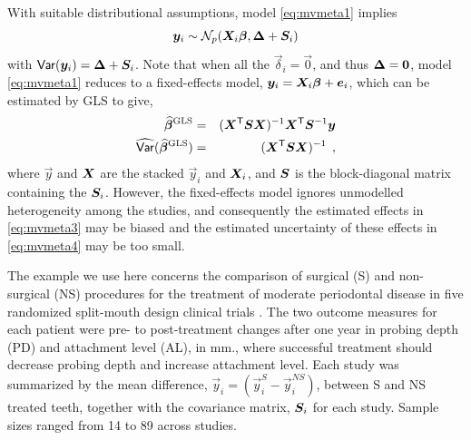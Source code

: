 With suitable distributional assumptions, model \eqref{eq:mvmeta1} implies
\begin{equation}\label{eq:mvmeta2}
	\bm{y}_i \sim \mathcal{N}_p ( \bm{X}_i \bm{\beta}, \bm{\Delta} + \bm{S}_i)
\end{equation}
with $\mathsf{Var}(\bm{y}_i) = \bm{\Delta} + \bm{S}_i$. Note that when all the
$\vec{\delta}_i = \vec{0}$, and thus $\bm{\Delta}=\bm{0}$,
model \eqref{eq:mvmeta1} reduces to a fixed-effects model, $\bm{y}_i = \bm{X}_i \bm{\beta} + \bm{e}_i$,
which can be estimated by GLS to give,
\begin{eqnarray}
\widehat{\bm{\beta}}^{\textrm{GLS}} & = & (\bm{X}^\mathsf{T} \bm{S} \bm{X})^{-1} \bm{X}^\mathsf{T} \bm{S}^{-1} \bm{y} \label{eq:mvmeta3} \\
\widehat{\mathsf{Var}}(\widehat{\bm{\beta}}^{\textrm{GLS}}) & = & (\bm{X}^\mathsf{T} \bm{S} \bm{X})^{-1}  \label{eq:mvmeta4} \:\: ,
\end{eqnarray}
where $\vec{y}$ and $\bm{X}$ are the stacked $\vec{y}_i$ and $\bm{X}_i$, and
$\bm{S}$ is the block-diagonal matrix containing the $\bm{S}_i$.
However, the fixed-effects model ignores unmodelled heterogeneity among the studies,
and consequently the estimated effects in \eqref{eq:mvmeta3} may be biased and 
the estimated uncertainty of these effects in \eqref{eq:mvmeta4} may be too small.

The example we use here concerns the comparison of surgical (S) and
non-surgical (NS) procedures for the treatment of moderate periodontal
disease in five randomized split-mouth design clinical trials
\citep{Antczak-Bouckoms-etal:1993,Berkey-etal:1998}.
The two outcome measures for each patient were pre- to post-treatment changes after one year
in probing depth (PD) and attachment level (AL), in mm., where successful treatment
should decrease probing depth and increase attachment level.
Each study was summarized by the mean difference, $\vec{y}_i = (\vec{y}_i^S - \vec{y}_i^{NS})$,
between S and NS treated teeth, together with the covariance matrix, $\bm{S}_i$ for each study.
Sample sizes ranged from 14 to 89 across studies.

